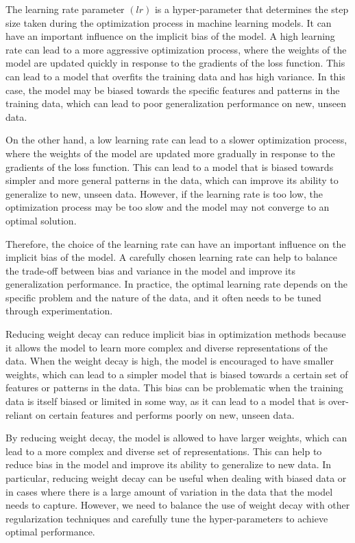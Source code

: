 The learning rate parameter $(lr)$ is a hyper-parameter that determines the step size taken during the optimization process in machine learning models. It can have an important influence on the implicit bias of the model. A high learning rate can lead to a more aggressive optimization process, where the weights of the model are updated quickly in response to the gradients of the loss function. This can lead to a model that overfits the training data and has high variance. In this case, the model may be biased towards the specific features and patterns in the training data, which can lead to poor generalization performance on new, unseen data.\cite{2}

On the other hand, a low learning rate can lead to a slower optimization process, where the weights of the model are updated more gradually in response to the gradients of the loss function. This can lead to a model that is biased towards simpler and more general patterns in the data, which can improve its ability to generalize to new, unseen data. However, if the learning rate is too low, the optimization process may be too slow and the model may not converge to an optimal solution. 

Therefore, the choice of the learning rate can have an important influence on the implicit bias of the model. A carefully chosen learning rate can help to balance the trade-off between bias and variance in the model and improve its generalization performance. In practice, the optimal learning rate depends on the specific problem and the nature of the data, and it often needs to be tuned through experimentation.

Reducing weight decay can reduce implicit bias in optimization methods because it allows the model to learn more complex and diverse representations of the data. When the weight decay is high, the model is encouraged to have smaller weights, which can lead to a simpler model that is biased towards a certain set of features or patterns in the data. This bias can be problematic when the training data is itself biased or limited in some way, as it can lead to a model that is over-reliant on certain features and performs poorly on new, unseen data.\cite{3}

By reducing weight decay, the model is allowed to have larger weights, which can lead to a more complex and diverse set of representations. This can help to reduce bias in the model and improve its ability to generalize to new data. In particular, reducing weight decay can be useful when dealing with biased data or in cases where there is a large amount of variation in the data that the model needs to capture.\cite{4} However, we need to balance the use of weight decay with other regularization techniques and carefully tune the hyper-parameters to achieve optimal performance.

